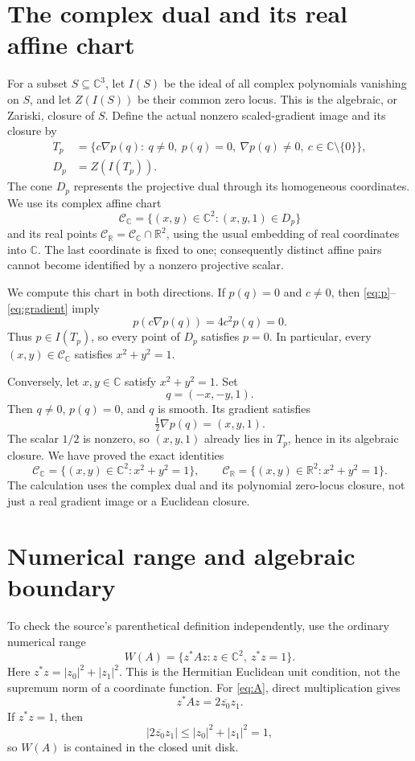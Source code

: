 \documentclass[10pt,letterpaper]{article}
\newcommand{\R}{\mathbb{R}}
\newcommand{\C}{\mathbb{C}}
\newcommand{\CC}{\mathcal{C}}
\begin{document}
\section{The complex dual and its real affine chart}
For a subset $S\subseteq\C^3$, let $I(S)$ be the ideal of all complex polynomials vanishing on $S$, and let $Z(I(S))$ be their common zero locus. This is the algebraic, or Zariski, closure of $S$. Define the actual nonzero scaled-gradient image and its closure by
\begin{align*}
T_p&=\{c\nabla p(q):\ q\ne0,\ p(q)=0,\ \nabla p(q)\ne0,\ c\in\C\setminus\{0\}\},\\
D_p&=Z(I(T_p)).
\end{align*}
The cone $D_p$ represents the projective dual through its homogeneous coordinates. We use its complex affine chart
\[
\CC_{\C}=\{(x,y)\in\C^2:(x,y,1)\in D_p\}
\]
and its real points $\CC_{\R}=\CC_{\C}\cap\R^2$, using the usual embedding of real coordinates into $\C$. The last coordinate is fixed to one; consequently distinct affine pairs cannot become identified by a nonzero projective scalar.

We compute this chart in both directions. If $p(q)=0$ and $c\ne0$, then \eqref{eq:p}--\eqref{eq:gradient} imply
\[
p(c\nabla p(q))=4c^2p(q)=0.
\]
Thus $p\in I(T_p)$, so every point of $D_p$ satisfies $p=0$. In particular, every $(x,y)\in\CC_{\C}$ satisfies $x^2+y^2=1$.

Conversely, let $x,y\in\C$ satisfy $x^2+y^2=1$. Set
\[
q=(-x,-y,1).
\]
Then $q\ne0$, $p(q)=0$, and $q$ is smooth. Its gradient satisfies
\[
\tfrac12\nabla p(q)=(x,y,1).
\]
The scalar $1/2$ is nonzero, so $(x,y,1)$ already lies in $T_p$, hence in its algebraic closure. We have proved the exact identities
\begin{equation}\label{eq:dualcircle}
\CC_{\C}=\{(x,y)\in\C^2:x^2+y^2=1\},\qquad
\CC_{\R}=\{(x,y)\in\R^2:x^2+y^2=1\}.
\end{equation}
The calculation uses the complex dual and its polynomial zero-locus closure, not just a real gradient image or a Euclidean closure.

\section{Numerical range and algebraic boundary}
To check the source's parenthetical definition independently, use the ordinary numerical range
\[
W(A)=\{z^*Az:z\in\C^2,\ z^*z=1\}.
\]
Here $z^*z=|z_0|^2+|z_1|^2$. This is the Hermitian Euclidean unit condition, not the supremum norm of a coordinate function. For \eqref{eq:A}, direct multiplication gives
\[
z^*Az=2\overline{z_0}z_1.
\]
If $z^*z=1$, then
\[
|2\overline{z_0}z_1|\le |z_0|^2+|z_1|^2=1,
\]
so $W(A)$ is contained in the closed unit disk.
\end{document}
